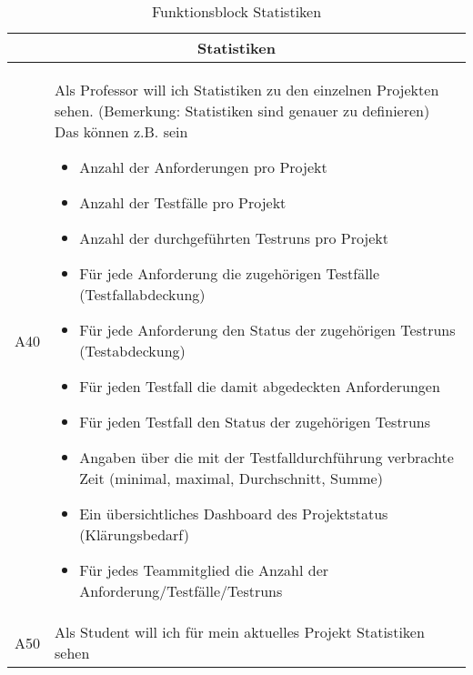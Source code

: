 \documentclass[11pt,a4paper]{report}
\begin{document}
\begin{table}[htpb]
\caption{Funktionsblock Statistiken}
\begin{center}
\begin{tabular}{|p{}|p{}|}

    \hline
    \multicolumn{2}{|c|}{Statistiken}\\
    \hline
    A40 &  Als Professor will ich Statistiken zu den einzelnen Projekten sehen.
(Bemerkung: Statistiken sind genauer zu definieren) Das können z.B. sein    
\begin{itemize}
\setlength\itemsep{0.1em}
\item Anzahl der Anforderungen pro Projekt
\item Anzahl der Testfälle pro Projekt
\item Anzahl der durchgeführten Testruns pro Projekt
\item Für jede Anforderung die zugehörigen Testfälle (Testfallabdeckung)
\item Für jede Anforderung den Status der zugehörigen Testruns (Testabdeckung)
\item Für jeden Testfall die damit abgedeckten Anforderungen
\item Für jeden Testfall den Status der zugehörigen Testruns
\item Angaben über die mit der Testfalldurchführung verbrachte Zeit (minimal, maximal, Durchschnitt, Summe)
\item Ein übersichtliches Dashboard des Projektstatus (Klärungsbedarf)
\item Für jedes Teammitglied die Anzahl der Anforderung/Testfälle/Testruns 

\end{itemize}

    \\
\hline
    A50 & Als Student will ich für mein aktuelles Projekt Statistiken sehen\\
    \hline
  
\end{tabular}
\end{center}
\label{t:funkstat}
\end{table}
\end{document}
